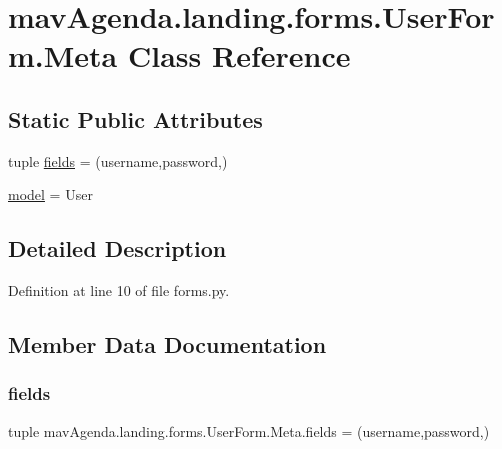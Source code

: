 \hypertarget{classmavAgenda_1_1landing_1_1forms_1_1UserForm_1_1Meta}{}\section{mav\+Agenda.\+landing.\+forms.\+User\+Form.\+Meta Class Reference}
\label{classmavAgenda_1_1landing_1_1forms_1_1UserForm_1_1Meta}
\subsection*{Static Public Attributes}
\begin{DoxyCompactItemize}
\item 
tuple \mbox{\hyperlink{classmavAgenda_1_1landing_1_1forms_1_1UserForm_1_1Meta_a97252d38cdae6fef62afd36b2f0df9de}{fields}} = (\textquotesingle{}username\textquotesingle{},\textquotesingle{}password\textquotesingle{},)
\item 
\mbox{\hyperlink{classmavAgenda_1_1landing_1_1forms_1_1UserForm_1_1Meta_ab6d084f5f3a564e17ea9a015494d614c}{model}} = User
\end{DoxyCompactItemize}


\subsection{Detailed Description}


Definition at line 10 of file forms.\+py.



\subsection{Member Data Documentation}
\mbox{\label{classmavAgenda_1_1landing_1_1forms_1_1UserForm_1_1Meta_a97252d38cdae6fef62afd36b2f0df9de}} 
\subsubsection{\texorpdfstring{fields}{fields}}
{\footnotesize\ttfamily tuple mav\+Agenda.\+landing.\+forms.\+User\+Form.\+Meta.\+fields = (\textquotesingle{}username\textquotesingle{},\textquotesingle{}password\textquotesingle{},)\hspace{0.3cm}{\ttfamily [static]}}



